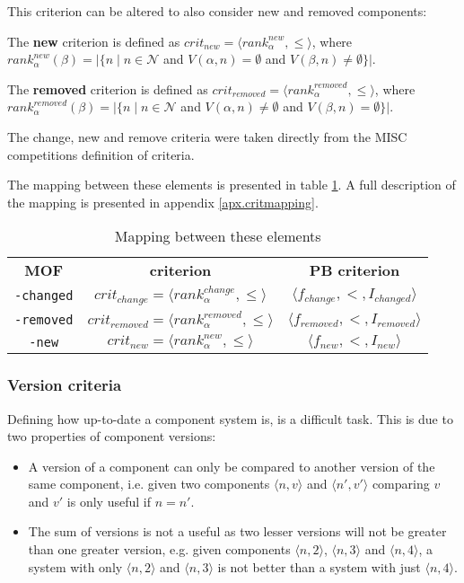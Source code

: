 This criterion can be altered to also consider new and removed components:
\begin{defs}
	The \textbf{new} criterion is defined as $crit_{new} = \langle rank^{new}_{\alpha}, \leq \rangle$,
	where $rank^{new}_{\alpha}(\beta) = |\{n \mid n \in \mathcal{N}$ and $V(\alpha,n) = \emptyset$ and $V(\beta,n) \neq \emptyset\}|$.
\end{defs}

\begin{defs}
	The \textbf{removed} criterion is defined as $crit_{removed} = \langle rank^{removed}_{\alpha}, \leq \rangle$,
	where $rank^{removed}_{\alpha}(\beta) = |\{n \mid n \in \mathcal{N}$ and $V(\alpha,n) \neq \emptyset$ and $V(\beta,n) =\emptyset\}|$.
\end{defs}

The change, new and remove criteria were taken directly from the MISC competitions definition of criteria.

The mapping between these elements is presented in table \ref{impl.critmapping}.
A full description of the mapping is presented in appendix \ref{apx.critmapping}.
\begin{table}
\begin{tabular}{c | c | c}
\textbf{MOF} 		& \textbf{\modelname criterion} & \textbf{PB criterion} \\
\texttt{-changed} 	& $crit_{change} = \langle rank^{change}_{\alpha}, \leq \rangle$ & $\langle f_{change}, <, I_{changed} \rangle$ \\
\texttt{-removed} 	& $crit_{removed} = \langle rank^{removed}_{\alpha}, \leq \rangle$ & $\langle f_{removed}, <, I_{removed} \rangle$ \\
\texttt{-new} 	& $crit_{new} = \langle rank^{new}_{\alpha}, \leq \rangle$ & $\langle f_{new}, <, I_{new} \rangle$ \\
\end{tabular}
\caption{Mapping between these elements}
\label{impl.critmapping}
\end{table}

\subsubsection{Version criteria}
Defining how up-to-date a component system is, is a difficult task. 
This is due to two properties of component versions:
\begin{itemize}
  \item A version of a component can only be compared to another version of the same component, 
  i.e. given two components $\langle n,v \rangle$ and  $\langle n',v' \rangle$ comparing $v$ and $v'$ is only useful if $n = n'$.
  \item The sum of versions is not a useful as two lesser versions will not be greater than one greater version, e.g. given components $\langle n,2 \rangle$,  $\langle n,3 \rangle$ and  $\langle n,4 \rangle$,
  a system with only $\langle n,2 \rangle$ and $\langle n,3 \rangle$ is not better than a system with just $\langle n,4 \rangle$. 
\end{itemize}

